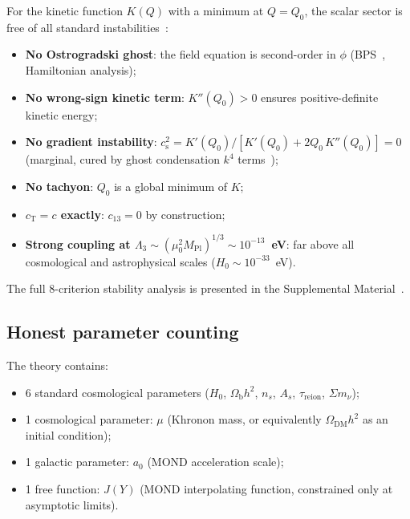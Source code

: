 \documentclass[prd,twocolumn,superscriptaddress,longbibliography,floatfix]{revtex4-2}
\newcommand{\cs}{c_{\mathrm{s}}}
\newcommand{\cT}{c_{\mathrm{T}}}
\begin{document}
For the kinetic function $K(Q)$ with a minimum at $Q = Q_0$,
the scalar sector is free of all standard instabilities~\cite{AHCLM2004,BS2024}:
\begin{itemize}
\item \textbf{No Ostrogradski ghost}: the field equation is
  second-order in $\phi$ (BPS~\cite{BPS2010}, Hamiltonian analysis);
\item \textbf{No wrong-sign kinetic term}: $K''(Q_0) > 0$ ensures
  positive-definite kinetic energy;
\item \textbf{No gradient instability}: $\cs^2 = K'(Q_0)/
  [K'(Q_0) + 2Q_0\,K''(Q_0)] = 0$ (marginal, cured by
  ghost condensation $k^4$ terms~\cite{AHCLM2004});
\item \textbf{No tachyon}: $Q_0$ is a global minimum of $K$;
\item \textbf{$\cT = c$ exactly}: $c_{13} = 0$ by construction;
\item \textbf{Strong coupling at $\Lambda_3 \sim (\mu_0^2 M_{\mathrm{Pl}})^{1/3}
  \sim 10^{-13}$~eV}: far above all cosmological and astrophysical
  scales ($H_0 \sim 10^{-33}$~eV).
\end{itemize}
The full 8-criterion stability analysis is presented in the
Supplemental Material~\cite{stability_SM}.

\subsection{Honest parameter counting}
\label{sec:params}

The theory contains:
\begin{itemize}
\item 6 standard cosmological parameters
  ($H_0$, $\Omega_{\mathrm{b}}h^2$, $n_s$, $A_s$, $\tau_{\mathrm{reion}}$,
  $\Sigma m_\nu$);
\item 1 cosmological parameter: $\mu$ (Khronon mass, or
  equivalently $\Omega_{\mathrm{DM}}h^2$ as an initial condition);
\item 1 galactic parameter: $a_0$ (MOND acceleration scale);
\item 1 free function: $J(Y)$ (MOND interpolating function,
  constrained only at asymptotic limits).
\end{itemize}
\end{document}

